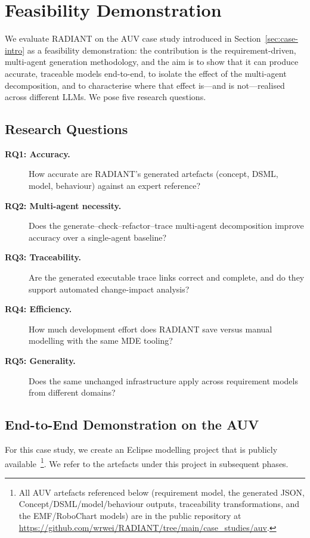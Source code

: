 \section{Feasibility Demonstration}
\label{sec:eval}

We evaluate RADIANT on the AUV case study introduced in Section~\ref{sec:case-intro} as a feasibility demonstration: the contribution is the requirement-driven, multi-agent generation methodology, and the aim is to show that it can produce accurate, traceable models end-to-end, to isolate the effect of the multi-agent decomposition, and to characterise where that effect is---and is not---realised across different LLMs.
We pose five research questions.

\subsection{Research Questions}
\label{sec:eval:rqs}
\begin{description}
    \item[\textbf{RQ1: Accuracy.}] How accurate are RADIANT's generated artefacts (concept, DSML, model, behaviour) against an expert reference?
    \item[\textbf{RQ2: Multi-agent necessity.}] Does the generate--check--refactor--trace multi-agent decomposition improve accuracy over a single-agent baseline?
    \item[\textbf{RQ3: Traceability.}] Are the generated executable trace links correct and complete, and do they support automated change-impact analysis?
    \item[\textbf{RQ4: Efficiency.}] How much development effort does RADIANT save versus manual modelling with the same MDE tooling?
    \item[\textbf{RQ5: Generality.}] Does the same unchanged infrastructure apply across requirement models from different domains?
\end{description}

\subsection{End-to-End Demonstration on the AUV}
\label{sec:demo}
For this case study, we create an Eclipse modelling project that is publicly available~\footnote{All AUV artefacts referenced below (requirement model, the generated JSON, Concept/DSML/model/behaviour outputs, traceability transformations, and the EMF/RoboChart models) are in the public repository at \url{https://github.com/wrwei/RADIANT/tree/main/case_studies/auv}.}. We refer to the artefacts under this project in subsequent phases.

